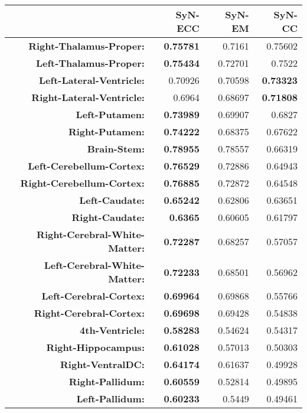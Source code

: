 \begin{table}[htbp]
  \centering
  {\small
    \begin{tabular}{rrrr}
    \toprule
          & \textbf{SyN-ECC} & \textbf{SyN-EM} & \textbf{SyN-CC} \\
    \midrule
    \textbf{Right-Thalamus-Proper:} & \textbf{0.75781} & 0.7161 & 0.75602 \\
    \textbf{Left-Thalamus-Proper:} & \textbf{0.75434} & 0.72701 & 0.7522 \\
    \textbf{Left-Lateral-Ventricle:} & 0.70926 & 0.70598 & \textbf{0.73323} \\
    \textbf{Right-Lateral-Ventricle:} & 0.6964 & 0.68697 & \textbf{0.71808} \\
    \textbf{Left-Putamen:} & \textbf{0.73989} & 0.69907 & 0.6827 \\
    \textbf{Right-Putamen:} & \textbf{0.74222} & 0.68375 & 0.67622 \\
    \textbf{Brain-Stem:} & \textbf{0.78955} & 0.78557 & 0.66319 \\
    \textbf{Left-Cerebellum-Cortex:} & \textbf{0.76529} & 0.72886 & 0.64943 \\
    \textbf{Right-Cerebellum-Cortex:} & \textbf{0.76885} & 0.72872 & 0.64548 \\
    \textbf{Left-Caudate:} & \textbf{0.65242} & 0.62806 & 0.63651 \\
    \textbf{Right-Caudate:} & \textbf{0.6365} & 0.60605 & 0.61797 \\
    \textbf{Right-Cerebral-White-Matter:} & \textbf{0.72287} & 0.68257 & 0.57057 \\
    \textbf{Left-Cerebral-White-Matter:} & \textbf{0.72233} & 0.68501 & 0.56962 \\
    \textbf{Left-Cerebral-Cortex:} & \textbf{0.69964} & 0.69868 & 0.55766 \\
    \textbf{Right-Cerebral-Cortex:} & \textbf{0.69698} & 0.69428 & 0.54838 \\
    \textbf{4th-Ventricle:} & \textbf{0.58283} & 0.54624 & 0.54317 \\
    \textbf{Right-Hippocampus:} & \textbf{0.61028} & 0.57013 & 0.50303 \\
    \textbf{Right-VentralDC:} & \textbf{0.64174} & 0.61637 & 0.49928 \\
    \textbf{Right-Pallidum:} & \textbf{0.60559} & 0.52814 & 0.49895 \\
    \textbf{Left-Pallidum:} & \textbf{0.60233} & 0.5449 & 0.49461 \\

\end{tabular}}
\end{table}
